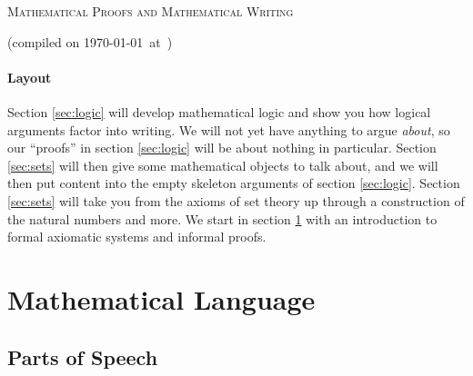 \documentclass[12pt]{article}
\newcommand{\note}[1]{[This portion has yet to be written.]}
\begin{document}
\begin{center} {\Large \scshape Mathematical Proofs and Mathematical Writing}
\end{center}
(compiled on \today\ at\ \currenttime)
\hfill

\tableofcontents

\paragraph{Layout}
Section \ref{sec:logic} will develop mathematical logic and show you how logical arguments factor into writing.
We will not yet have anything to argue \emph{about}, so our ``proofs'' in section \ref{sec:logic} will be about nothing in particular.
Section \ref{sec:sets} will then give some mathematical objects to talk about, and we will then put
content into the empty skeleton arguments of section \ref{sec:logic}.
Section \ref{sec:sets} will take you from the axioms of set theory up through a construction of the natural numbers and more.
We start in section \ref{sec:lang} with an introduction to formal axiomatic systems and informal proofs.

\section{Mathematical Language}
\label{sec:lang}








\subsection{Parts of Speech}
\label{sec:parts_of_speech}
\end{document}
